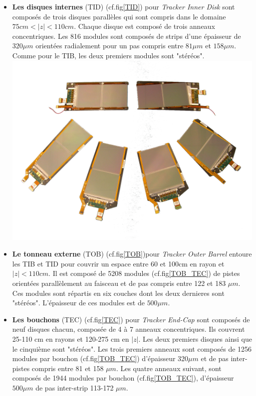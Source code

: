 \begin{itemize}[label=$\bullet$]
\item \textbf{Les disques internes} (TID) (cf.fig\ref{TID}) pour \textit{Tracker Inner Disk} sont composés de trois disques parallèles qui sont compris dans le domaine $75cm<|z|<110cm$. Chaque disque est composé de trois anneaux concentriques. Les 816 modules sont composés de strips d'une épaisseur de $320\mu m$ orientées radialement pour un pas compris entre $81\mu m$ et $158\mu m$. Comme pour le TIB, les deux premiers modules sont "stéréos".
\marginpar
{
	\centering
	\includegraphics[width=\marginparwidth]{CMS/TOB_TEC.png}
	\label{TOB_TEC}
}
\item \textbf{Le tonneau externe } (TOB) (cf.fig\ref{TOB})pour \textit{Tracker Outer Barrel} entoure les TIB et TID pour couvrir un espace entre 60 et 100cm en rayon et $|z|<110cm$. Il est composé de 5208 modules (cf.fig\ref{TOB_TEC}) de pistes orientées parallèlement au faisceau et de pas compris entre 122 et 183 $\mu m$. Ces modules sont répartis en six couches dont les deux dernieres sont "stéréos". L'épaisseur de ces modules est de $500\mu m$.   

\item \textbf{Les bouchons }(TEC) (cf.fig\ref{TEC}) pour \textit{Tracker End-Cap} sont composés de neuf disques chacun, composée de 4 à 7 anneaux concentriques. Ils couvrent 25-110 cm en rayons et 120-275 cm en $|z|$. Les deux premiers disques ainsi que le cinquième sont "stéréos". Les trois premiers anneaux sont composés de 1256 modules par bouchon (cf.fig\ref{TOB_TEC}) d'épaisseur 320$\mu m$ et de pas inter-pistes compris entre 81 et 158 $\mu m$. Les quatre anneaux suivant, sont composés de 1944 modules par bouchon (cf.fig\ref{TOB_TEC}), d'épaisseur $500\mu m$ de pas inter-strip 113-172 $\mu m$.
\end{itemize}

